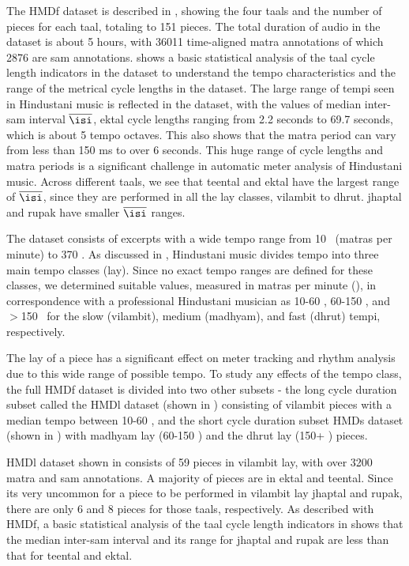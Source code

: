The \acrshort{HMDf} dataset is described in , showing the four \glspl{taal} and the number of pieces for each \gls{taal}, totaling to 151 pieces. The total duration of audio in the dataset is about 5 hours, with 36011 time-aligned \gls{matra} annotations of which 2876 are \gls{sam} annotations.  shows a basic statistical analysis of the \gls{taal} cycle length indicators in the dataset to understand the tempo characteristics and the range of the metrical cycle lengths in the dataset. The large range of tempi seen in Hindustani music is reflected in the dataset, with the values of median inter-\gls{sam} interval $\overline{\isi}$, \gls{ektal} cycle lengths ranging from 2.2 seconds to 69.7 seconds, which is about 5 tempo octaves. This also shows that the \gls{matra} period can vary from less than 150 ms to over 6 seconds. This huge range of cycle lengths and \gls{matra} periods is a significant challenge in automatic meter analysis of Hindustani music. Across different \glspl{taal}, we see that \gls{teental} and \gls{ektal} have the largest range of $\overline{\isi}$, since they are performed in all the \gls{lay} classes, \gls{vilambit} to \gls{dhrut}. \Gls{jhaptal} and \gls{rupak} have smaller $\overline{\isi}$ ranges. 

The dataset consists of excerpts with a wide tempo range from 10 \mpm\ (\glspl{matra} per minute) to 370 \mpm. As discussed in , Hindustani music divides tempo into three main tempo classes (\gls{lay}). Since no exact tempo ranges are defined for these classes, we determined suitable values, measured in \glspl{matra} per minute (\mpm), in correspondence with a professional Hindustani musician as 10-60 \mpm, 60-150 \mpm, and $>$150 \mpm\ for the slow (\gls{vilambit}), medium (\gls{madhyam}), and fast (\gls{dhrut}) tempi, respectively. 

The \gls{lay} of a piece has a significant effect on meter tracking and rhythm analysis due to this wide range of possible tempo. To study any effects of the tempo class, the full \acrshort{HMDf} dataset is divided into two other subsets - the long cycle duration subset called the \acrshort{HMDl} dataset (shown in ) consisting of \gls{vilambit} pieces with a median tempo between 10-60 \mpm, and the short cycle duration subset \acrshort{HMDs} dataset (shown in ) with \gls{madhyam} \gls{lay} (60-150 \mpm) and the \gls{dhrut} \gls{lay} (150+ \mpm) pieces. 

\acrshort{HMDl} dataset shown in  consists of 59 pieces in \gls{vilambit} \gls{lay}, with over 3200 \gls{matra} and \gls{sam} annotations. A majority of pieces are in \gls{ektal} and \gls{teental}. Since its very uncommon for a piece to be performed in \gls{vilambit} \gls{lay} \gls{jhaptal} and \gls{rupak}, there are only 6 and 8 pieces for those \glspl{taal}, respectively. As described with \acrshort{HMDf}, a basic statistical analysis of the \gls{taal} cycle length indicators in  shows that the median inter-\gls{sam} interval and its range for \gls{jhaptal} and \gls{rupak} are less than that for \gls{teental} and \gls{ektal}.


